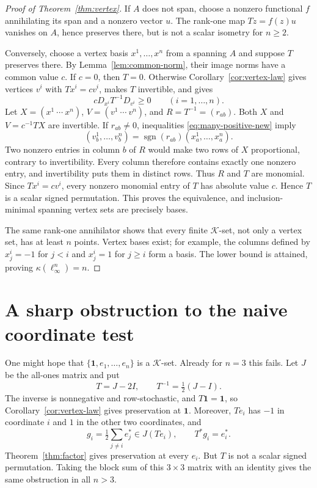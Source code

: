 \documentclass[11pt]{article}
\theoremstyle{definition}
\theoremstyle{remark}
\newcommand{\K}{\mathcal K}
\newcommand{\sgn}{\operatorname{sgn}}
\newcommand{\one}{\mathbf 1}
\begin{document}
\begin{proof}[Proof of Theorem~\ref{thm:vertex}]
If $A$ does not span, choose a nonzero functional $f$ annihilating its span
and a nonzero vector $u$.  The rank-one map $Tz=f(z)u$ vanishes on $A$, hence
preserves there, but is not a scalar isometry for $n\geq2$.

Conversely, choose a vertex basis $x^1,\ldots,x^n$ from a spanning $A$ and
suppose $T$ preserves there.  By Lemma~\ref{lem:common-norm}, their image
norms have a common value $c$.  If $c=0$, then $T=0$.  Otherwise
Corollary~\ref{cor:vertex-law} gives vertices $v^i$ with
$Tx^i=cv^i$, makes $T$ invertible, and gives
\begin{equation}\label{eq:many-positive-new}
 cD_{x^i}T^{-1}D_{v^i}\geq0\qquad(i=1,\ldots,n).
\end{equation}
Let $X=(x^1\ \cdots\ x^n)$, $V=(v^1\ \cdots\ v^n)$, and
$R=T^{-1}=(r_{ab})$.  Both $X$ and $V=c^{-1}TX$ are invertible.  If
$r_{ab}\neq0$, inequalities \eqref{eq:many-positive-new} imply
\begin{equation}\label{eq:row-match-new}
 (v_b^1,\ldots,v_b^n)
 =\sgn(r_{ab})(x_a^1,\ldots,x_a^n).
\end{equation}
Two nonzero entries in column $b$ of $R$ would make two rows of $X$
proportional, contrary to invertibility.  Every column therefore contains
exactly one nonzero entry, and invertibility puts them in distinct rows.
Thus $R$ and $T$ are monomial.  Since $Tx^i=cv^i$, every nonzero monomial
entry of $T$ has absolute value $c$.  Hence $T$ is a scalar signed
permutation.  This proves the equivalence, and inclusion-minimal spanning
vertex sets are precisely bases.

The same rank-one annihilator shows that every finite $\K$-set, not only a
vertex set, has at least $n$ points.  Vertex bases exist; for example, the
columns defined by $x^i_j=-1$ for $j<i$ and $x^i_j=1$ for $j\geq i$ form a
basis.  The lower bound is attained, proving
$\kappa(\ell_\infty^n)=n$.
\end{proof}

\section{A sharp obstruction to the naive coordinate test}

One might hope that $\{\one,e_1,\ldots,e_n\}$ is a $\K$-set.  Already for
$n=3$ this fails.  Let $J$ be the all-ones matrix and put
\begin{equation}\label{eq:obstruction}
 T=J-2I,\qquad T^{-1}=\tfrac12(J-I).
\end{equation}
The inverse is nonnegative and row-stochastic, and $T\one=\one$, so
Corollary~\ref{cor:vertex-law} gives preservation at $\one$.  Moreover,
$Te_i$ has $-1$ in coordinate $i$ and $1$ in the other two coordinates, and
\[
 g_i=\tfrac12\sum_{j\neq i}e_j^*\in J(Te_i),
 \qquad T^*g_i=e_i^*.
\]
Theorem~\ref{thm:factor} gives preservation at every $e_i$.  But $T$ is not
a scalar signed permutation.  Taking the block sum of this $3\times3$
matrix with an identity gives the same obstruction in all $n>3$.
\end{document}

